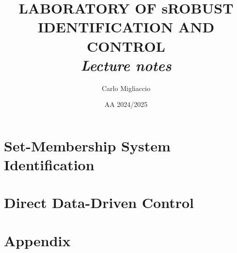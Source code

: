 \documentclass[a4paper, 12pt]{report}
\title{
    {\color{black}
    \textbf{  \Huge{  LABORATORY OF
    sROBUST IDENTIFICATION AND CONTROL } }\\}
    \textit{Lecture notes}
    \linespread{2}
}
\author{Carlo Migliaccio}
\date{AA 2024/2025}
\theoremstyle{definition}
\theoremstyle{remark}
\begin{document}
\maketitle
\tableofcontents


\part{Set-Membership System Identification}





\part{Direct Data-Driven Control}


\part{Appendix}


\end{document}
